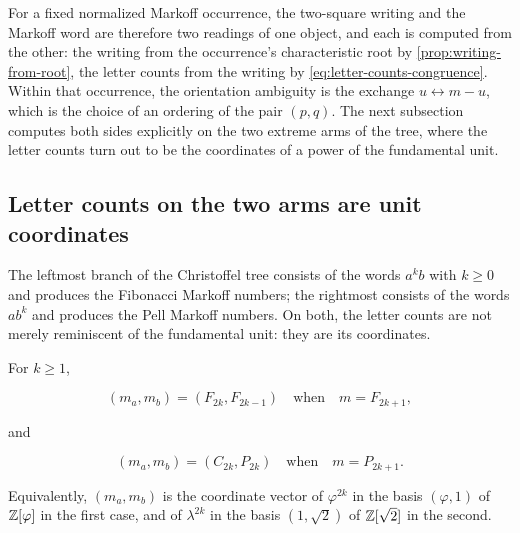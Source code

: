 For a fixed normalized Markoff occurrence, the two-square writing and the
Markoff word are therefore two readings of one object, and each is computed
from the other: the writing from the occurrence's characteristic root by
\cref{prop:writing-from-root}, the letter counts from the writing by
\cref{eq:letter-counts-congruence}. Within that occurrence, the orientation
ambiguity is the exchange $u\leftrightarrow m-u$, which is the choice of an
ordering of the pair $(p,q)$. The next subsection computes both sides
explicitly on the two extreme arms of the tree, where the letter counts turn
out to be the coordinates of a power of the fundamental unit.

\subsection{Letter counts on the two arms are unit coordinates}

The leftmost branch of the Christoffel tree consists of the words $a^kb$
with $k\geqslant0$ and produces the Fibonacci Markoff numbers; the rightmost
consists of the words $ab^k$ and produces the Pell Markoff numbers. On both, the letter
counts are not merely reminiscent of the fundamental unit: they are its
coordinates.

\begin{proposition}
\label{prop:arm-letter-counts}
For $k\geqslant1$,

\begin{equation}
 (m_a,m_b)=(F_{2k},F_{2k-1})
 \quad\text{when}\quad
 m=F_{2k+1},
 \label{eq:fib-arm-counts}
\end{equation}

and

\begin{equation}
 (m_a,m_b)=(C_{2k},P_{2k})
 \quad\text{when}\quad
 m=P_{2k+1}.
 \label{eq:pell-arm-counts}
\end{equation}

Equivalently, $(m_a,m_b)$ is the coordinate vector of $\varphi^{2k}$ in the
basis $(\varphi,1)$ of $\mathbb{Z}[\varphi]$ in the first case, and of $\lambda^{2k}$
in the basis $(1,\sqrt2)$ of $\mathbb{Z}[\sqrt2]$ in the second.
\end{proposition}

